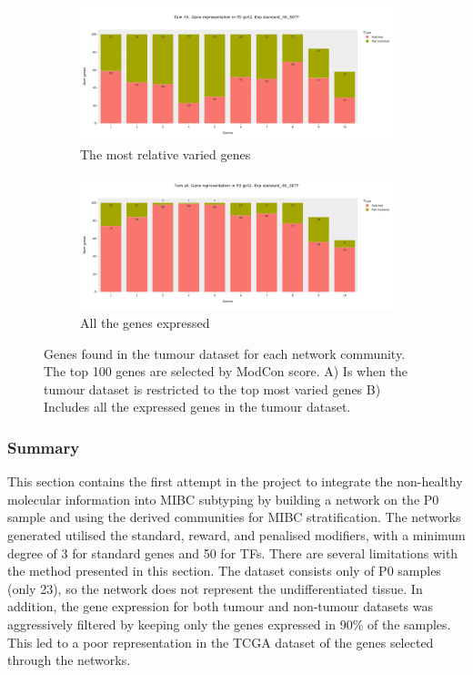 {\begin{figure}[!htb]
    \hfill
    \begin{subfigure}[b]{0.47\textwidth}
        \centering
        \includegraphics[width=\textwidth,keepaspectratio]{Sections/Network_I/Resources/P0/4K_p0_modConMev_rep_standard_4K_50TF_v3.png}
        \caption{The most relative varied genes}
    \end{subfigure}
    \hfill
    \begin{subfigure}[b]{0.47\textwidth}
        \centering
        \includegraphics[width=\textwidth,keepaspectratio]{Sections/Network_I/Resources/P0/13K_p0_modConMev_rep_standard_4K_50TF_v3.png}
        \caption{All the genes expressed}
    \end{subfigure}
    \hfill
    \caption{Genes found in the tumour dataset for each network community. The top 100 genes are selected by ModCon score. A) Is when the tumour dataset is restricted to the top most varied genes B) Includes all the expressed genes in the tumour dataset. }
    \label{fig:N_I:p0_mev_rep}
\end{figure}


\subsubsection{Summary}

This section contains the first attempt in the project to integrate the non-healthy molecular information into MIBC subtyping by building a network on the P0 sample and using the derived communities for MIBC stratification. The networks generated utilised the standard, reward, and penalised modifiers, with a minimum degree of 3 for standard genes and 50 for TFs. There are several limitations with the method presented in this section. The dataset consists only of P0 samples (only 23), so the network does not represent the undifferentiated tissue. In addition, the gene expression for both tumour and non-tumour datasets was aggressively filtered by keeping only the genes expressed in 90\% of the samples. This led to a poor representation in the TCGA dataset of the genes selected through the networks.

}
